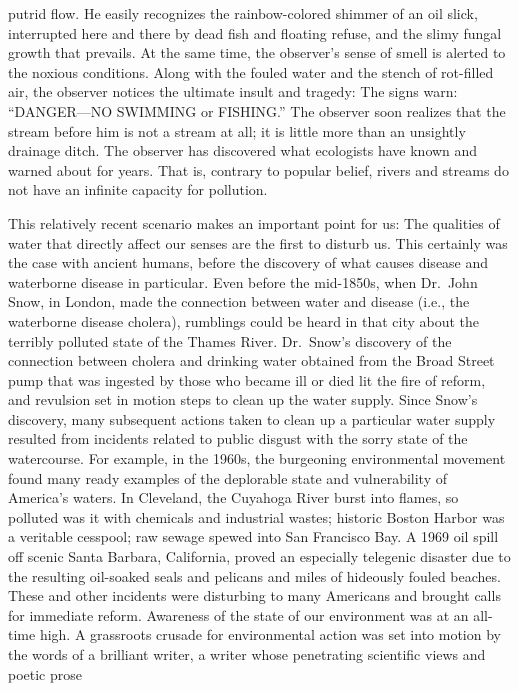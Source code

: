 \documentclass{article}
\begin{document}
putrid flow. He easily recognizes the rainbow-colored shimmer of an oil
slick, interrupted here and there by dead fish and floating refuse, and
the slimy fungal growth that prevails. At the same time, the observer's
sense of smell is alerted to the noxious conditions. Along with the
fouled water and the stench of rot-filled air, the observer notices the
ultimate insult and tragedy: The signs warn: ``DANGER---NO SWIMMING or
FISHING.'' The observer soon realizes that the stream before him is not
a stream at all; it is little more than an unsightly drainage ditch. The
observer has discovered what ecologists have known and warned about for
years. That is, contrary to popular belief, rivers and streams do not
have an infinite capacity for pollution.

This relatively recent scenario makes an important point for us: The
qualities of water that directly affect our senses are the first to
disturb us. This certainly was the case with ancient humans, before the
discovery of what causes disease and waterborne disease in particular.
Even before the mid-1850s, when Dr.~John Snow, in London, made the
connection between water and disease (i.e., the waterborne disease
cholera), rumblings could be heard in that city about the terribly
polluted state of the Thames River. Dr.~Snow's discovery of the
connection between cholera and drinking water obtained from the Broad
Street pump that was ingested by those who became ill or died lit the
fire of reform, and revulsion set in motion steps to clean up the water
supply. Since Snow's discovery, many subsequent actions taken to clean
up a particular water supply resulted from incidents related to public
disgust with the sorry state of the watercourse. For example, in the
1960s, the burgeoning environmental movement found many ready examples
of the deplorable state and vulnerability of America's waters. In
Cleveland, the Cuyahoga River burst into flames, so polluted was it with
chemicals and industrial wastes; historic Boston Harbor was a veritable
cesspool; raw sewage spewed into San Francisco Bay. A 1969 oil spill off
scenic Santa Barbara, California, proved an especially telegenic
disaster due to the resulting oil-soaked seals and pelicans and miles of
hideously fouled beaches. These and other incidents were disturbing to
many Americans and brought calls for immediate reform. Awareness of the
state of our environment was at an all-time high. A grassroots crusade
for environmental action was set into motion by the words of a brilliant
writer, a writer whose penetrating scientific views and poetic prose
\end{document}
